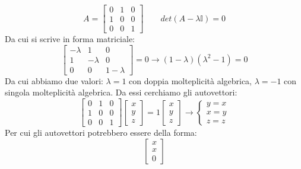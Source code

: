 \begin{exmp}
    \begin{equation*}
        A=
        \begin{bmatrix}
            0 & 1 & 0 \\
            1 & 0 & 0 \\
            0 & 0 & 1
        \end{bmatrix} \qquad
        det(A-\lambda\mathbb{I})=0
    \end{equation*}
    Da cui si scrive in forma matriciale:
    \begin{equation*}
        \begin{bmatrix}
            -\lambda & 1 & 0 \\
            1 & -\lambda & 0 \\
            0 & 0 & 1-\lambda
        \end{bmatrix} = 0 \longrightarrow
        (1-\lambda)(\lambda^2-1)=0
    \end{equation*}
    Da cui abbiamo due valori: $\lambda=1$ con doppia molteplicità algebrica, $\lambda=-1$ con singola molteplicità algebrica. Da essi cerchiamo gli autovettori:
    \begin{equation*}
        \begin{bmatrix}
            0 & 1 & 0 \\
            1 & 0 & 0 \\
            0 & 0 & 1
        \end{bmatrix}
        \begin{bmatrix}
            x \\ y \\ z
        \end{bmatrix} =
        1
        \begin{bmatrix}
            x \\ y \\ z
        \end{bmatrix} \longrightarrow
        \begin{cases}
            y=x \\
            x=y \\
            z=z
        \end{cases}
    \end{equation*}
    Per cui gli autovettori potrebbero essere della forma:
    \begin{equation*}
        \begin{bmatrix}
            x \\ x \\ 0

\end{bmatrix}
\end{equation*}
\end{exmp}

